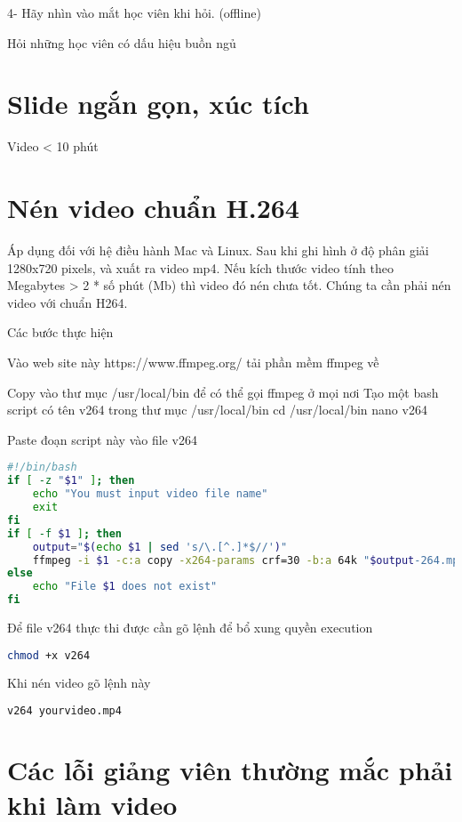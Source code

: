 4- Hãy nhìn vào mắt học viên khi hỏi. (offline)

Hỏi những học viên có dấu hiệu buồn ngủ

\section{Slide ngắn gọn, xúc tích}

Video < 10 phút

\section{Nén video chuẩn H.264}

Áp dụng đối với hệ điều hành Mac và Linux. Sau khi ghi hình ở độ phân giải 1280x720 pixels, và xuất ra video mp4. Nếu kích thước video tính theo Megabytes > 2 * số phút (Mb) thì video đó nén chưa tốt. Chúng ta cần phải nén video với chuẩn H264.

Các bước thực hiện

Vào web site này https://www.ffmpeg.org/ tải phần mềm ffmpeg về

Copy vào thư mục /usr/local/bin để có thể gọi ffmpeg ở mọi nơi
Tạo một bash script có tên v264 trong thư mục /usr/local/bin
cd /usr/local/bin
nano v264

Paste đoạn script này vào file v264

\begin{lstlisting}[language=bash]
#!/bin/bash
if [ -z "$1" ]; then
    echo "You must input video file name"
    exit
fi
if [ -f $1 ]; then
	output="$(echo $1 | sed 's/\.[^.]*$//')"
	ffmpeg -i $1 -c:a copy -x264-params crf=30 -b:a 64k "$output-264.mp4"
else
	echo "File $1 does not exist"
fi
\end{lstlisting}

Để file v264 thực thi được cần gõ lệnh để bổ xung quyền execution

\begin{lstlisting}[language=bash]
chmod +x v264
\end{lstlisting}

Khi nén video gõ lệnh này

\begin{lstlisting}[language=bash]
v264 yourvideo.mp4
\end{lstlisting}

\section{Các lỗi giảng viên thường mắc phải khi làm video}

